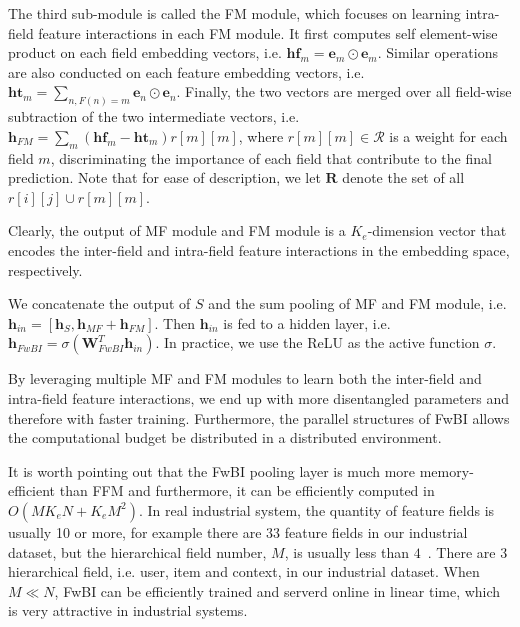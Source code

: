 \documentclass[sigconf]{acmart}
\newcommand{\Real}{\mathcal{R}}
\begin{document}
The third sub-module is called the FM module, which focuses on learning intra-field feature interactions in each FM module. It first computes self element-wise product on each field embedding vectors, i.e. $\mathbf{hf}_{m} =\mathbf{e}_m\odot \mathbf{e}_m$. 
Similar operations are also conducted on each feature embedding vectors,  i.e. $\mathbf{ht}_{m} =\sum_{n, F(n)=m} \mathbf{e}_n \odot \mathbf{e}_n$. 
Finally, the two vectors are merged over all field-wise subtraction of the two intermediate vectors, i.e. $\mathbf{h}_{FM}= \sum_{m} (\mathbf{hf}_{m}-\mathbf{ht}_{m} ) r[m][m]$, where $r[m][m] \in \Real$ is a weight for each field $m$, discriminating the importance of each field that contribute to the final prediction. Note that for ease of description, we let $\mathbf{R}$ denote the set of all $r[i][j]\cup r[m][m]$.

Clearly, the output of MF module and FM module is a $K_e$-dimension vector that encodes the inter-field and intra-field feature interactions in the embedding space, respectively.

We concatenate the output of $S$ and the sum pooling of MF and FM module, i.e. $\mathbf{h}_{in}=[\mathbf{h}_S,\mathbf{h}_{MF} + \mathbf{h}_{FM}]$. 
Then $\mathbf{h}_{in}$ is fed to a hidden layer,  i.e. $\mathbf{h}_{FwBI}=\sigma( \mathbf{W}_{FwBI}^T \mathbf{h}_{in} )$. 
In practice, we use the ReLU as the active function $\sigma$. 

By leveraging multiple MF and FM modules to learn both the inter-field and intra-field feature interactions, we end up with more disentangled parameters and therefore with faster training. Furthermore, the parallel structures of FwBI allows the computational budget be distributed in a distributed environment. 

It is worth pointing out that the FwBI pooling layer is much more memory-efficient than FFM and furthermore, it can be efficiently computed in $O(MK_eN + K_eM^2)$. In real industrial system, the quantity of feature fields is usually 10 or more, for example there are 33 feature fields in our industrial dataset, but the hierarchical field number, $M$, is usually less than $4$~\citep{liu2017pbodl,covington2016deep}. There are $3$ hierarchical field, i.e. user, item and context, in our industrial dataset. When $M \ll N$, FwBI can be efficiently trained and serverd online in linear time, which is very attractive in industrial systems.
\end{document}
